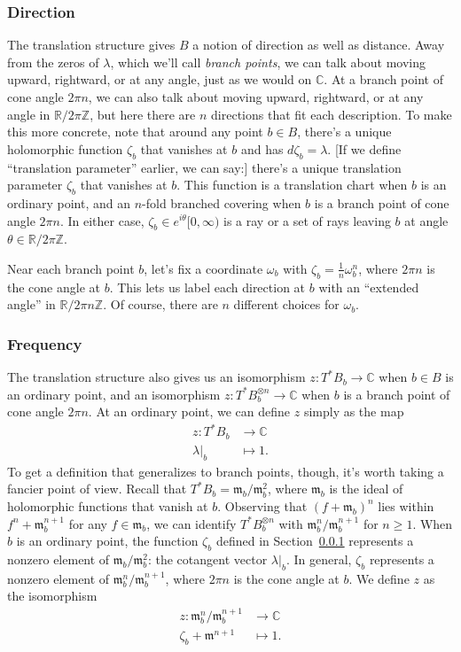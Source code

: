 \documentclass{article}
\theoremstyle{definition}
\newcommand{\maps}{\colon}
\newcommand{\Z}{\mathbb{Z}}
\newcommand{\R}{\mathbb{R}}
\newcommand{\C}{\mathbb{C}}
\newcommand{\van}{\mathfrak{m}}
\begin{document}
\subsubsection{Direction}\label{transl:dir}
The translation structure gives $B$ a notion of direction as well as distance. Away from the zeros of $\lambda$, which we'll call {\em branch points}, we can talk about moving upward, rightward, or at any angle, just as we would on $\C$. At a branch point of cone angle $2\pi n$, we can also talk about moving upward, rightward, or at any angle in $\R/2\pi\Z$, but here there are $n$ directions that fit each description. To make this more concrete, note that around any point $b \in B$, there's a unique holomorphic function $\zeta_b$ that vanishes at $b$ and has $d\zeta_b = \lambda$. \textcolor{VioletRed}{[If we define ``translation parameter'' earlier, we can say:] there's a unique translation parameter $\zeta_b$ that vanishes at $b$.} This function is a translation chart when $b$ is an ordinary point, and an $n$-fold branched covering when $b$ is a branch point of cone angle $2\pi n$. In either case, $\zeta_b \in e^{i\theta} [0, \infty)$ is a ray or a set of rays leaving $b$ at angle $\theta \in \R/2\pi\Z$.

Near each branch point $b$, let's fix a coordinate $\omega_b$ with $\zeta_b = \tfrac{1}{n} \omega_b^n$, where $2\pi n$ is the cone angle at $b$. This lets us label each direction at $b$ with an ``extended angle'' in $\R/2\pi n\Z$. Of course, there are $n$ different choices for $\omega_b$.

\subsubsection{Frequency}\label{transl-freq}

The translation structure also gives us an isomorphism $z \maps T^*B_b \to \C$ when $b \in B$ is an ordinary point, and an isomorphism $z \maps T^*B_b^{\otimes n} \to \C$ when $b$ is a branch point of cone angle $2\pi n$. At an ordinary point, we can define $z$ simply as the map
\begin{align*}
z \maps T^*B_b & \to \C \\
\lambda\big|_b & \mapsto 1.
\end{align*}
To get a definition that generalizes to branch points, though, it's worth taking a fancier point of view. Recall that $T^*B_b = \van_b / \van_b^2$, where $\van_b$ is the ideal of holomorphic functions that vanish at $b$. Observing that $(f + \van_b)^n$ lies within $f^n + \van_b^{n+1}$ for any $f \in \van_b$, we can identify $T^*B_b^{\otimes n}$ with $\van_b^n / \van_b^{n+1}$ for $n \ge 1$. When $b$ is an ordinary point, the function $\zeta_b$ defined in Section~\ref{transl:dir} represents a nonzero element of $\van_b / \van_b^2$: the cotangent vector $\lambda\big|_b$. In general, $\zeta_b$ represents a nonzero element of $\van_b^n / \van_b^{n+1}$, where $2\pi n$ is the cone angle at $b$. We define $z$ as the isomorphism
\begin{align*}
z \maps \van_b^n / \van_b^{n+1} & \to \C \\
\zeta_b + \van^{n+1} & \mapsto 1.
\end{align*}
\end{document}
